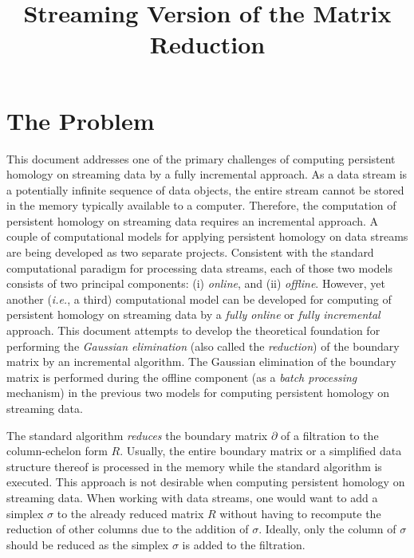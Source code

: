 \documentclass[11pt]{article}
\begin{document}
\title{Streaming Version of the Matrix Reduction}

\maketitle

\section{The Problem}

This document addresses one of the primary challenges of computing persistent homology on streaming 
data by a fully incremental approach.  As a data stream is a potentially infinite sequence of data 
objects, the entire stream cannot be stored in the memory typically available to a computer.  
Therefore, the computation of persistent homology on streaming data requires an incremental 
approach.  A couple of computational models for applying persistent homology on data streams are 
being developed as two separate projects.  Consistent with the standard computational paradigm 
\cite{silva-13} for processing data streams, each of those two models consists of two principal 
components: (i) \emph{online}, and (ii) \emph{offline}.  However, yet another (\emph{i.e.}, a 
third) computational model can be developed for computing of persistent homology on streaming data 
by a \emph{fully online} or \emph{fully incremental} approach.  This document attempts to develop 
the theoretical foundation for performing the \emph{Gaussian elimination} (also called the 
\emph{reduction}) of the boundary matrix \cite{edelsbrunner-00, zomorodian-05} by an incremental 
algorithm.  The Gaussian elimination of the boundary matrix is performed during the offline 
component (as a \emph{batch processing} mechanism) in the previous two models for computing 
persistent homology on streaming data.


The standard algorithm \cite{edelsbrunner-00, zomorodian-05} \emph{reduces} the boundary matrix 
$\partial$ of a filtration \cite{zomorodian-10} to the column-echelon form $R$.  Usually, the 
entire boundary matrix or a simplified data structure thereof is processed in the memory while the 
standard algorithm is executed.  This approach is not desirable when computing persistent homology 
on streaming data.    When 
working with data streams, one would want to add a simplex $\sigma$ to the already reduced matrix 
$R$ without having to recompute the reduction of other columns due to the addition of $\sigma$.  
Ideally, only the column of $\sigma$ should be reduced as the simplex $\sigma$ is added to the 
filtration.





\end{document}
